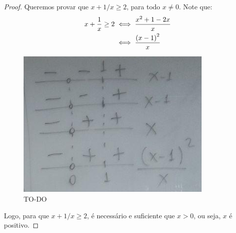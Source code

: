 \begin{proof}
Queremos provar que $x+1/x\ge 2$, para todo $x \ne 0$. Note que:
%
\begin{align*}
x+\dfrac{1}{x}\ge 2 &\iff \dfrac{x^2+1-2x}{x} \\
		&\iff \dfrac{\left(x-1\right)^2}{x}
\end{align*}

\begin{figure}[H]
\caption{TO-DO}
\includegraphics{../../res/img/[ok]photo_2018-08-24_22-55-35(2).jpg}
\centering
\end{figure}

Logo, para que $x+1/x\ge 2$, é necessário e suficiente que $x > 0$, ou seja, $x$ é positivo.
\end{proof}